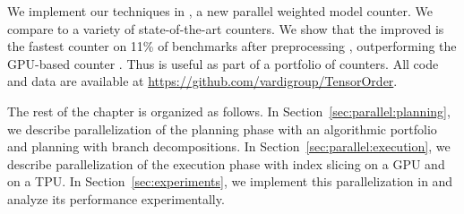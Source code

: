 We implement our techniques in , a new parallel weighted model counter. We compare  to a variety of state-of-the-art counters. We show that the improved  is the fastest counter on 11\% of benchmarks after preprocessing \cite{LM14}, outperforming the GPU-based counter  \cite{FHZ19}. Thus  is useful as part of a portfolio of counters. All code and data are available at  \url{https://github.com/vardigroup/TensorOrder}.

The rest of the chapter is organized as follows. 
In Section~\ref{sec:parallel:planning}, we describe parallelization of the planning phase with an algorithmic portfolio and planning with branch decompositions.
In Section~\ref{sec:parallel:execution}, we describe parallelization of the execution phase with index slicing on a GPU and on a TPU. 
In Section~\ref{sec:experiments}, we implement this parallelization in  and analyze its performance experimentally.







